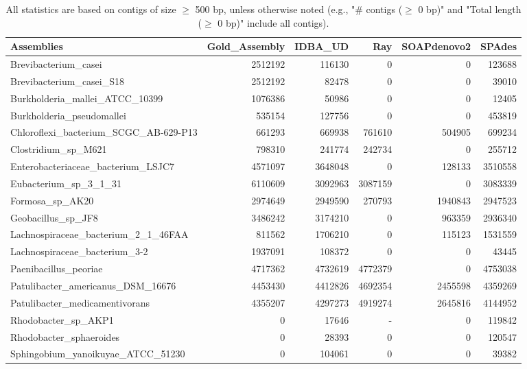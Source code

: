 \documentclass[12pt,a4paper]{article}
\begin{document}
\begin{table}[ht]
\begin{center}
\caption{All statistics are based on contigs of size $\geq$ 500 bp, unless otherwise noted (e.g., "\# contigs ($\geq$ 0 bp)" and "Total length ($\geq$ 0 bp)" include all contigs).}
\begin{tabular}{|l*{5}{|r}|}
\hline
Assemblies & Gold\_Assembly & IDBA\_UD & Ray & SOAPdenovo2 & SPAdes \\ \hline
Brevibacterium\_casei & 2512192 & 116130 & 0 & 0 & 123688 \\ \hline
Brevibacterium\_casei\_S18 & 2512192 & 82478 & 0 & 0 & 39010 \\ \hline
Burkholderia\_mallei\_ATCC\_10399 & 1076386 & 50986 & 0 & 0 & 12405 \\ \hline
Burkholderia\_pseudomallei & 535154 & 127756 & 0 & 0 & 453819 \\ \hline
Chloroflexi\_bacterium\_SCGC\_AB-629-P13 & 661293 & 669938 & 761610 & 504905 & 699234 \\ \hline
Clostridium\_sp\_M621 & 798310 & 241774 & 242734 & 0 & 255712 \\ \hline
Enterobacteriaceae\_bacterium\_LSJC7 & 4571097 & 3648048 & 0 & 128133 & 3510558 \\ \hline
Eubacterium\_sp\_3\_1\_31 & 6110609 & 3092963 & 3087159 & 0 & 3083339 \\ \hline
Formosa\_sp\_AK20 & 2974649 & 2949590 & 270793 & 1940843 & 2947523 \\ \hline
Geobacillus\_sp\_JF8 & 3486242 & 3174210 & 0 & 963359 & 2936340 \\ \hline
Lachnospiraceae\_bacterium\_2\_1\_46FAA & 811562 & 1706210 & 0 & 115123 & 1531559 \\ \hline
Lachnospiraceae\_bacterium\_3-2 & 1937091 & 108372 & 0 & 0 & 43445 \\ \hline
Paenibacillus\_peoriae & 4717362 & 4732619 & 4772379 & 0 & 4753038 \\ \hline
Patulibacter\_americanus\_DSM\_16676 & 4453430 & 4412826 & 4692354 & 2455598 & 4359269 \\ \hline
Patulibacter\_medicamentivorans & 4355207 & 4297273 & 4919274 & 2645816 & 4144952 \\ \hline
Rhodobacter\_sp\_AKP1 & 0 & 17646 & - & 0 & 119842 \\ \hline
Rhodobacter\_sphaeroides & 0 & 28393 & 0 & 0 & 120547 \\ \hline
Sphingobium\_yanoikuyae\_ATCC\_51230 & 0 & 104061 & 0 & 0 & 39382 \\ \hline

\end{tabular}
\end{center}
\end{table}
\end{document}

